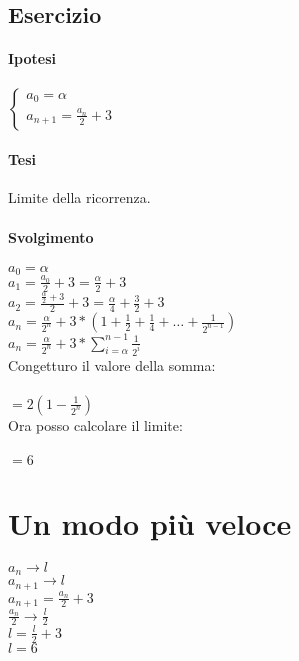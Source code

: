 \documentclass{article}
\begin{document}
\subsection{Esercizio}
\paragraph{Ipotesi}
\(\begin{cases}
	a_0 = \alpha\\
	a_{n+1} = \frac{a_n}{2} + 3
\end{cases}\)

\paragraph{Tesi}
Limite della ricorrenza.

\paragraph{Svolgimento}
\(a_0 = \alpha\)\\
\(a_1 = \frac{a_0}{2} + 3 = \frac{\alpha}{2} + 3\)\\
\(a_2 = \frac{\frac{\alpha}{2} + 3}{2} + 3 = \frac{\alpha}{4} + \frac{3}{2} + 3\)\\
\(a_n = \frac{\alpha}{2^n} + 3 * (1 + \frac{1}{2} + \frac{1}{4} + \dots + \frac{1}{2^{n-1}})\)\\
\(a_n = \frac{\alpha}{2^n} + 3 * \displaystyle\sum_{i=\alpha}^{n-1} \frac{1}{2^i}\)\\
Congetturo il valore della somma:\\
[svolgimento omesso]\\
\(= 2(1 - \frac{1}{2^n})\)\\
Ora posso calcolare il limite:\\
[svolgimento omesso]\\
\(= 6\)\\

\section{Un modo più veloce}
\(a_n \to l\)\\
\(a_{n+1} \to l\)\\
\(a_{n+1} = \frac{a_n}{2} + 3\)\\
\(\frac{a_n}{2} \to \frac{l}{2}\)\\
\(l = \frac{l}{2} + 3\)\\
\(l = 6\)\\\\
\end{document}
